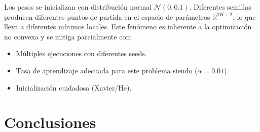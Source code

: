 \documentclass[12pt,a4paper]{article}
\theoremstyle{definition}
\begin{document}
Los pesos se inicializan con distribuci\'{o}n normal $\mathcal{N}(0, 0.1)$. Diferentes semillas producen diferentes puntos de partida en el espacio de par\'{a}metros $\mathbb{R}^{2H+2}$, lo que lleva a diferentes m\'{i}nimos locales. Este fen\'{o}meno es inherente a la optimizaci\'{o}n no convexa y se mitiga parcialmente con:
\begin{itemize}
    \item M\'{u}ltiples ejecuciones con diferentes seeds.
    \item Tasa de aprendizaje adecuada para este problema siendo ($\alpha = 0.01$).
    \item Inicializaci\'{o}n cuidadosa (Xavier/He).
\end{itemize}

\section{Conclusiones}\label{sec:conclusiones}
\end{document}
